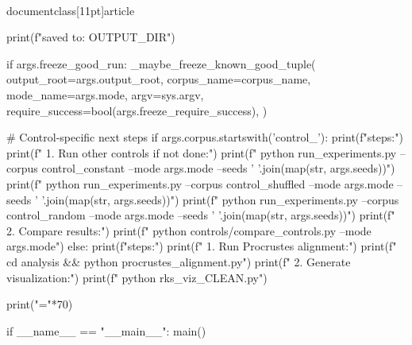 \\documentclass[11pt]{article}
\begin{document}
\begin{CodeBlock}
    print(f"\nResults saved to: {OUTPUT_DIR}")

    if args.freeze_good_run:
        _maybe_freeze_known_good_tuple(
            output_root=args.output_root,
            corpus_name=corpus_name,
            mode_name=args.mode,
            argv=sys.argv,
            require_success=bool(args.freeze_require_success),
        )
    
    # Control-specific next steps
    if args.corpus.startswith('control_'):
        print(f"\nNext steps:")
        print(f"  1. Run other controls if not done:")
        print(f"     python run_experiments.py --corpus control_constant --mode {args.mode} --seeds {' '.join(map(str, args.seeds))}")
        print(f"     python run_experiments.py --corpus control_shuffled --mode {args.mode} --seeds {' '.join(map(str, args.seeds))}")
        print(f"     python run_experiments.py --corpus control_random --mode {args.mode} --seeds {' '.join(map(str, args.seeds))}")
        print(f"  2. Compare results:")
        print(f"     python controls/compare_controls.py --mode {args.mode}")
    else:
        print(f"\nNext steps:")
        print(f"  1. Run Procrustes alignment:")
        print(f"     cd analysis && python procrustes_alignment.py")
        print(f"  2. Generate visualization:")
        print(f"     python rks_viz_CLEAN.py")
    
    print("="*70)


if __name__ == "__main__":
    main()

\end{CodeBlock}
\end{document}
